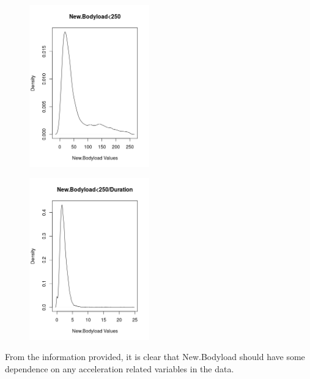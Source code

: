\begin{figure}[h]
	\centering
	\begin{minipage}{.5\textwidth}
		\centering
		\includegraphics[width=.8\linewidth, height=7cm]{Images/NBLDensityPlot.png}
		\label{fig:test1}
	\end{minipage}%
	\begin{minipage}{.5\textwidth}
		\centering
		\includegraphics[width=.8\linewidth, height=7cm]{Images/NBLDivDurDensityPlot.png}
		\label{fig:test2}
	\end{minipage}
\end{figure}
\hfill\break
\newline
From the information provided, it is clear that New.Bodyload should have some dependence on any acceleration related variables in the data.

